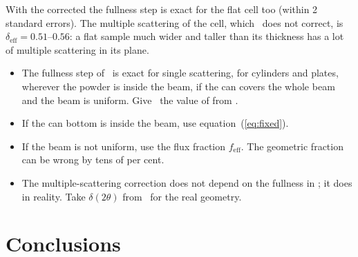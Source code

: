 \documentclass[11pt,a4paper]{report}
\begin{document}
With the corrected  the fullness step is exact for the flat cell
too (within 2 standard errors). The multiple scattering of the cell, which
\cor\ does not correct, is $\delta_\mathrm{eff} = 0.51$--$0.56$: a flat
sample much wider and taller than its thickness has a lot of multiple
scattering in its plane.

\begin{note}
\begin{itemize}
  \item The fullness step of \cor\ is exact for single scattering, for
        cylinders and plates, wherever the powder is inside the beam, if the
        can covers the whole beam and the beam is uniform. Give \cor\ the
        value of  from \mcams.
  \item If the can bottom is inside the beam, use equation~(\ref{eq:fixed}).
  \item If the beam is not uniform, use the flux fraction $f_\mathrm{eff}$.
        The geometric fraction can be wrong by tens of per cent.
  \item The multiple-scattering correction does not depend on the fullness in
        \cor; it does in reality. Take $\delta(2\theta)$ from \mcams\ for the
        real geometry.
\end{itemize}
\end{note}

\chapter{Conclusions}
\end{document}
